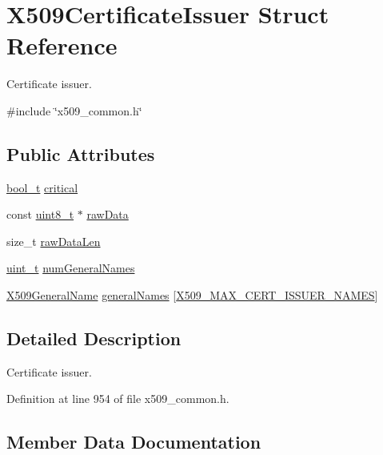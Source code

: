 \hypertarget{structX509CertificateIssuer}{}\section{X509\+Certificate\+Issuer Struct Reference}
\label{structX509CertificateIssuer}


Certificate issuer.  




{\ttfamily \#include \char`\"{}x509\+\_\+common.\+h\char`\"{}}

\subsection*{Public Attributes}
\begin{DoxyCompactItemize}
\item 
\hyperlink{compiler__port_8h_a812d16e5494522586b3784e55d479912}{bool\+\_\+t} \hyperlink{structX509CertificateIssuer_a69bdaad1cfc7c722a01daf1fea1b59c6}{critical}
\item 
const \hyperlink{stdint_8h_aba7bc1797add20fe3efdf37ced1182c5}{uint8\+\_\+t} $\ast$ \hyperlink{structX509CertificateIssuer_aca740e49878dfee5262e84711add3685}{raw\+Data}
\item 
size\+\_\+t \hyperlink{structX509CertificateIssuer_a7de1a5e5319cc043ecf8caee5e144a58}{raw\+Data\+Len}
\item 
\hyperlink{compiler__port_8h_a12a1e9b3ce141648783a82445d02b58d}{uint\+\_\+t} \hyperlink{structX509CertificateIssuer_aaa36ed84755aba7fc15aed1d88d6660c}{num\+General\+Names}
\item 
\hyperlink{structX509GeneralName}{X509\+General\+Name} \hyperlink{structX509CertificateIssuer_a5d622673ff3debbb98c1ab08a79951e8}{general\+Names} \mbox{[}\hyperlink{pkix_2x509__common_8h_a09e385209ce2093edad815e2a702f2c4}{X509\+\_\+\+M\+A\+X\+\_\+\+C\+E\+R\+T\+\_\+\+I\+S\+S\+U\+E\+R\+\_\+\+N\+A\+M\+ES}\mbox{]}
\end{DoxyCompactItemize}


\subsection{Detailed Description}
Certificate issuer. 

Definition at line 954 of file x509\+\_\+common.\+h.



\subsection{Member Data Documentation}
\mbox{\label{structX509CertificateIssuer_a69bdaad1cfc7c722a01daf1fea1b59c6}} 
